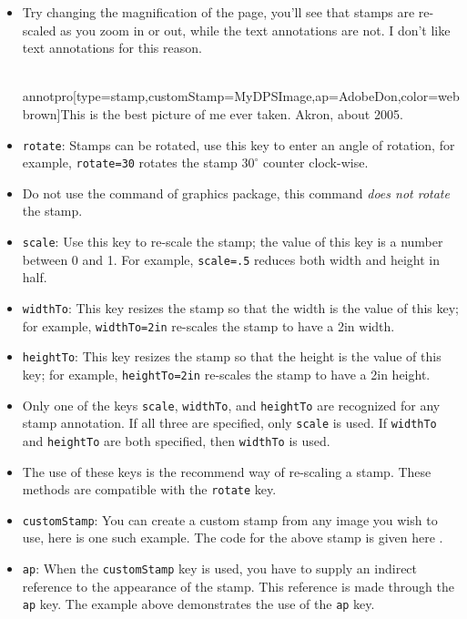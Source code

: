 \documentclass[12pt]{article}
\begin{document}
\begin{itemize}
\item[] Try changing the magnification of the page, you'll see that stamps are re-scaled as you zoom in or out, while
the text annotations are not. I don't like text annotations for this reason.

\begin{defineJS}{\annotstampv}
\\annotpro[type=stamp,customStamp=MyDPSImage,ap=AdobeDon,color=webbrown]{This is the best picture of me ever taken. Akron, about 2005.}
\end{defineJS}

\item\texttt{rotate}: Stamps can be rotated, use this key to enter an angle of rotation, for example,
    \texttt{rotate=30} rotates the stamp $\text{30}^\circ$ counter clock-wise.

\item[\textcolor{red}{\ding{043}}] Do not use the  command of \textsf{graphics} package,
this command \emph{does not rotate} the stamp.

\item \texttt{scale}: Use this key to re-scale the stamp; the value of this key is a number between
    0 and 1. For example, \texttt{scale=.5} reduces both width and height in half.
\item \texttt{widthTo}: This key resizes the stamp so that the width is the value of this key; for example,
    \texttt{widthTo=2in} re-scales the stamp to have a 2in width.
\item\texttt{heightTo}: This key resizes the stamp so that the height is the value of this key; for example,
    \texttt{heightTo=2in} re-scales the stamp to have a 2in height.

\item[] Only one of the keys \texttt{scale}, \texttt{widthTo}, and \texttt{heightTo} are recognized
    for any stamp annotation. If all three are specified, only \texttt{scale} is used. If
    \texttt{widthTo} and \texttt{heightTo} are both specified, then \texttt{widthTo} is used.

\item[\textcolor{red}{\ding{043}}] The use of these keys is the recommend way of re-scaling
a stamp. These methods are compatible with the \texttt{rotate} key.

\item \texttt{customStamp}: You can create a custom stamp from any
    image you wish to use, here is
     one such
    example. The code for the above stamp is given here
    \annotpro{\annotstampv}.

\item \texttt{ap}: When the \texttt{\texttt{customStamp}} key is
    used, you have to supply an indirect reference to the appearance of
    the stamp. This reference is made through the \texttt{ap} key. The
    example above demonstrates the use of the \texttt{ap} key.
\end{itemize}
\end{document}
